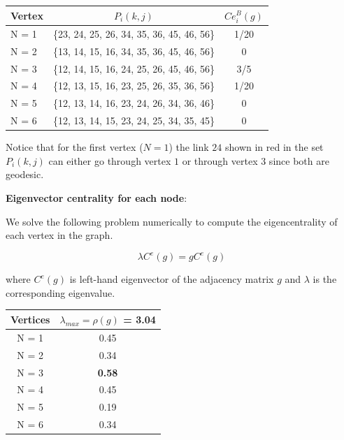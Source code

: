\documentclass[a4paper]{article}
\begin{document}
\begin{table}[ht!]
	\centering
	 \label{tab:title} 
	\begin{tabular}{l@{\hskip 0.5in}c@{\hskip 0.5in}c}
		Vertex & $P_i(k,j)$ &$Ce_i^B(g)$  \\
		\hline\hline
		
		N = 1    &  \{23, 24, 25, 26, 34, 35, 36, 45, 46, 56\} & 1/20\\
		N = 2   &   \{13, 14, 15, 16, 34, 35, 36, 45, 46, 56\}  & 0 \\
		N = 3   &   \{12, 14, 15, 16, 24, 25, 26, 45, 46, 56\}  &  3/5\\
		N = 4   &   \{12, 13, 15, 16, 23, 25, 26, 35, 36, 56\} & 1/20 \\
		N = 5   &   \{12, 13, 14, 16, 23, 24, 26, 34, 36, 46\} & 0 \\
		N = 6   &   \{12, 13, 14, 15, 23, 24, 25, 34, 35, 45\} & 0 \\
		
		\bottomrule[1pt]
	\end{tabular}
\end{table}

Notice that for the first vertex ($N=1$) the link $24$ shown in red in the set $P_i(k,j)$ can either go through vertex $1$ or through vertex $3$ since both are geodesic.  

\noindent \textbf{{\color{blue} Eigenvector centrality for each node}}:

\noindent We solve the following problem numerically to compute the eigencentrality of each vertex in the graph.

\begin{equation}
	\lambda C^e(g) = gC^e(g)
\end{equation} 

where $C^e(g)$ is left-hand eigenvector of the adjacency matrix $g$ and $\lambda$ is the corresponding eigenvalue. 

\begin{table}[ht!]
	\centering
	 \label{tab:title} 
	\begin{tabular}{cc}
		\hline
		
		Vertices & $\lambda_{max} = \rho(g)$ = \textbf{{\color{blue} 3.04}} \\
		\hline\hline
		N = 1 & 0.45  \\ 
		N = 2 & 0.34  \\
		N = 3 &  \textbf{{\color{red} 0.58}} \\
		N = 4 &  0.45  \\
		N = 5 & 0.19 \\
		N = 6 &  0.34 \\
		
		\bottomrule[1pt]
	\end{tabular}
\end{table}
\end{document}
